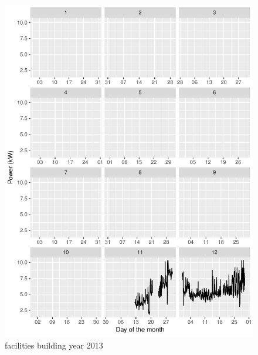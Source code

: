 \documentclass[11pt, oneside]{article}   	%
\begin{document}
\begin{figure}
\includegraphics[keepaspectratio]{facilities_build_Y2013.pdf}
\caption{facilities building year 2013 }
\end{figure}
\end{document}
